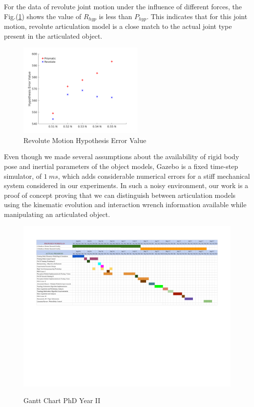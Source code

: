 \documentclass[12pt,a4paper]{report}
\begin{document}
For the data of revolute joint motion under the influence of different forces, the Fig.(\ref{rhypdiff}) shows the value of $R_{hyp}$ is less than $P_{hyp}$. This indicates that for this joint motion, revolute articulation model is a close match to the actual joint type present in the articulated object.

\begin{figure}[H]
  \centering
  \includegraphics[width=0.55\textwidth]{figures/rhypdiff.png}
  \caption{Revolute Motion Hypothesis Error Value}
  \label{rhypdiff}
\end{figure}

Even though we made several assumptions about the availability of rigid body pose and inertial parameters of the object models, Gazebo is a fixed time-step simulator, of $1~ms$, which adds considerable numerical errors for a stiff mechanical  system considered in our experiments. In such a noisy environment, our work is a proof of concept proving that we can distinguish between articulation models using the kinematic evolution and interaction wrench information available while manipulating an articulated object.



\begin{landscape}
	\begin{figure}[!ht]
		\centering
		\caption{Gantt Chart PhD Year II}
		\includegraphics[scale=1]{PhD_year2_gantt.pdf}
		\label{gantt}
	\end{figure}
\end{landscape}
\end{document}
